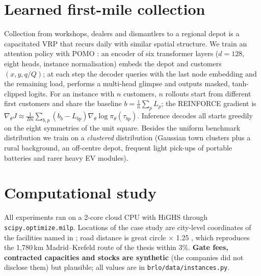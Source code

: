 \documentclass[11pt,a4paper]{article}
\begin{document}
\section{Learned first-mile collection}
\label{sec:firstmile}
Collection from workshops, dealers and dismantlers to a regional depot is a capacitated VRP that recurs daily with similar spatial structure. We train an attention policy \citep{kool2019} with POMO \citep{kwon2020}: an encoder of six transformer layers ($d=128$, eight heads, instance normalisation) embeds the depot and customers $(x,y,q/Q)$; at each step the decoder queries with the last node embedding and the remaining load, performs a multi-head glimpse and outputs masked, tanh-clipped logits. For an instance with $n$ customers, $n$ rollouts start from different first customers and share the baseline $b=\frac1n\sum_p L_p$; the REINFORCE gradient is $\nabla_\theta J\approx\frac{1}{Bn}\sum_{b,p}(b_b-L_{bp})\nabla_\theta\log\pi_\theta(\tau_{bp})$. Inference decodes all starts greedily on the eight symmetries of the unit square. Besides the uniform benchmark distribution \citep{nazari2018,kool2019} we train on a \emph{clustered} distribution (Gaussian town clusters plus a rural background, an off-centre depot, frequent light pick-ups of portable batteries and rarer heavy EV modules).

\section{Computational study}
\label{sec:results}
All experiments ran on a 2-core cloud CPU with HiGHS through \texttt{scipy.optimize.milp}. Locations of the case study are city-level coordinates of the facilities named in \citep{lozano2024}; road distance is great circle $\times$ 1.25 \citep{ballou2002}, which reproduces the 1{,}780\,km Madrid--Krefeld route of the thesis within 3\%. \textbf{Gate fees, contracted capacities and stocks are synthetic} (the companies did not disclose them) but plausible; all values are in \texttt{brlo/data/instances.py}.
\end{document}
